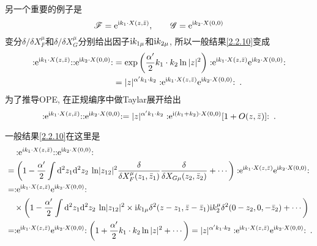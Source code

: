另一个重要的例子是
\begin{equation}
\mathscr{F}=\mathrm{e}^{\mathrm{i} k_{1} \cdot X(z, \bar{z})}, \qquad \mathscr{G}=\mathrm{e}^{\mathrm{i} k_{2} \cdot X(0,0)}
\end{equation}
变分$\delta / \delta X_{F}^{\mu}$和$\delta / \delta X_{G}^{\mu}$分别给出因子$\mathrm{i} k_{1 \mu}$和$\mathrm{i} k_{2 \mu}$, 所以一般结果\eqref{2.2.10}变成
\begin{align}
:\mathrel{\mathrm{e}^{\mathrm{i} k_{1} \cdot X(z, \bar{z})}}: : \mathrel{\mathrm{e}^{\mathrm{i} k_{2} \cdot X(0,0)}}: 
&=\exp \left(\frac{\alpha^{\prime}}{2} k_{1} \cdot k_{2} \ln |z|^{2}\right) :\mathrel{\mathrm{e}^{\mathrm{i} k_{1} \cdot X(z, \bar{z})} \mathrm{e}^{\mathrm{i} k_{2} \cdot X(0,0)}} : \nonumber \\
&=|z|^{\alpha^{\prime} k_{1} \cdot k_{2}}: \mathrel{ \mathrm{e}^{\mathrm{i} k_{1} \cdot X(z, \bar{z})} \mathrm{e}^{\mathrm{i} k_{2} \cdot X(0,0)}}: \:. \label{2.2.13}
\end{align}
为了推导OPE, 在正规编序中做Taylar展开给出
\begin{equation}
	:\mathrel{\mathrm{e}^{\mathrm{i} k_{1} \cdot X(z, \bar{z})}}: : \mathrel{\mathrm{e}^{\mathrm{i} k_{2} \cdot X(0,0)}}: 
	=|z|^{\alpha^{\prime} k_{1} \cdot k_{2}}: \mathrel{\mathrm{e}^{\mathrm{i}(k_{1}+k_{2}) \cdot X(0,0)}[1+O(z, \bar{z})]}: \:.
\end{equation}
\begin{tcolorbox}[breakable]
	\begin{remark}
		一般结果\eqref{2.2.10}在这里是
	\begin{align*}
	&\quad :\mathrel{ \mathrm{e}^{i k_{1} \cdot X(z,\bar{z})}}::\mathrel{\mathrm{e}^{\mathrm{i} k_{2} \cdot X(0,0)}}:\\
	&=\left(1-\frac{\alpha^{\prime}}{2} \int \mathrm{d}^{2} z_{1} \mathrm{d}^{2} z_{2}\: \ln \lvert z_{12}\rvert^{2} \frac{\delta}{\delta X_{F}^{\mu}(z_{1},\bar{z}_{1})} \frac{\delta}{\delta X_{G \mu}(z_{2}, \bar{z}_{2})} +\cdots \right):\mathrel{ \mathrm{e}^{\mathrm{i} k_{1} \cdot X(z, \bar{z})} \mathrm{e}^{\mathrm{i} k_{2} \cdot X(0,0)}}:\\
	&=:\mathrel{\mathrm{e}^{\mathrm{i} k_{1} \cdot X(z, \bar{z})} \mathrm{e}^{\mathrm{i} k_{2} \cdot X(0,0)}}: \\ 
	&\quad \times \left(1 -\frac{\alpha^{\prime}}{2} \int \mathrm{d}^{2} z_{1} \mathrm{d}^{2} z_{2}\: \ln \lvert z_{12}\rvert ^{2}
	 \times \mathrm{i} k_{1 \mu} \delta^{2}(z-z_{1}, \bar{z}-\bar{z}_{1}) \mathrm{i} k_{2}^{\mu} \delta^{2}(0-z_{2}, 0,-\bar{z}_{2})+ \cdots \right)\\
	&=:\mathrel{\mathrm{e}^{\mathrm{i} k_{1} \cdot X(z, \bar{z})} \mathrm{e}^{\mathrm{i} k_{2} \cdot X(0,0)}}: 
	\left(1+\frac{\alpha^{\prime}}{2} k_{1} \cdot k_{2} \ln |z|^{2}+\cdots\right)=
	|z|^{\alpha^{\prime} k_{1} \cdot k_{2}}: \mathrel{ \mathrm{e}^{\mathrm{i} k_{1} \cdot X(z, \bar{z})} \mathrm{e}^{\mathrm{i} k_{2} \cdot X(0,0)}}: \:.
	\end{align*}
	\end{remark}
\end{tcolorbox}

